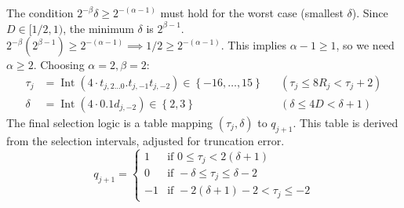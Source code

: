 \documentclass{article}
\DeclareMathOperator{\Int}{Int}
\begin{document}
The condition $2^{-\beta}\delta \geq 2^{-(\alpha-1)}$ must hold for the worst case (smallest $\delta$).
Since $D \in [1/2, 1)$, the minimum $\delta$ is $2^{\beta-1}$.
$2^{-\beta} (2^{\beta-1}) \geq 2^{-(\alpha-1)} \implies 1/2 \geq 2^{-(\alpha-1)}$.
This implies $\alpha-1 \geq 1$, so we need $\alpha \geq 2$.
Choosing $\alpha = 2, \beta = 2$:
\begin{align}
  \label{eq:division:radix2_tau_val}
  \tau_j &= \Int(4 \cdot t_{j,2\ldots0}.t_{j,-1}t_{j,-2}) \in \left\{-16, \dots, 15\right\} && (\tau_j \leq 8 R_j < \tau_j + 2) \\
  \label{eq:division:radix2_delta_val}
  \delta &= \Int(4 \cdot 0.1d_{j,-2}) \in \left\{2, 3\right\} && (\delta \leq 4 D < \delta + 1)
\end{align}
The final selection logic is a table mapping $(\tau_j, \delta)$ to $q_{j+1}$.
This table is derived from the selection intervals, adjusted for truncation error.
\begin{equation}
  \label{eq:division:radix2_logic_pos}
  q_{j+1} =
  \begin{cases}
    1  & \text{if } 0 \leq \tau_j < 2 (\delta + 1) \\
    0  & \text{if } -\delta \leq \tau_j \leq \delta - 2 \\
    -1 & \text{if } -2 (\delta + 1) - 2 < \tau_j \leq -2
  \end{cases}
\end{equation}
\end{document}
